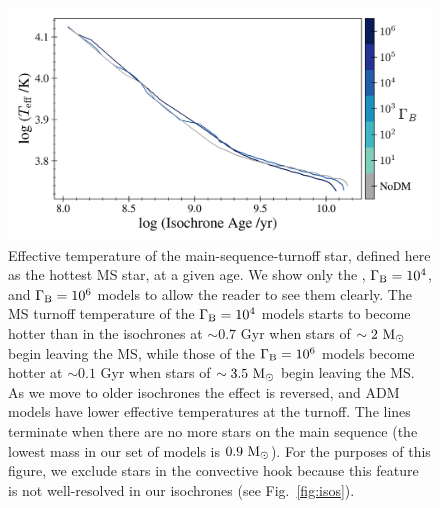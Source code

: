 \documentclass[useAMS,usenatbib]{mnras}
\begin{document}
\begin{figure}
    \centering
    \includegraphics[width=\textwidth]{plots/hotTeff.png}
    \caption{Effective temperature of the main-sequence-turnoff star, defined here as the hottest MS star, at a given age.
    We show only the \nodm, $\Gamma_\mathrm{B} = 10^{4}$, and $\Gamma_\mathrm{B} = 10^{6}$ models to allow the reader to see them clearly. The MS turnoff temperature of the $\Gamma_\mathrm{B} = 10^{4}$ models starts to become hotter than in the \nodm isochrones at $\sim 0.7$ Gyr when stars of $\sim 2 \ \mathrm{M}_{\odot}$ begin leaving the MS, while those of the $\Gamma_\mathrm{B} = 10^{6}$ models become hotter at $\sim 0.1$ Gyr when stars of $\sim 3.5 \ \mathrm{M}_{\odot}$ begin leaving the MS. As we move to older isochrones the effect is reversed, and ADM models have lower effective temperatures at the turnoff. The lines terminate when there are no more stars on the main sequence (the lowest mass in our set of models is $0.9 \ \mathrm{M}_{\odot}$).
    For the purposes of this figure, we exclude stars in the convective hook because this feature is not well-resolved in our isochrones (see Fig.~\ref{fig:isos}).
    }
    \label{fig:hotTeff}

\end{figure}
\end{document}
